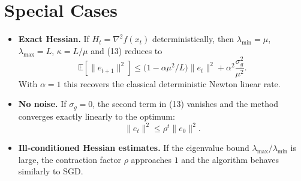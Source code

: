 \documentclass[11pt]{article}
\newcommand{\E}{\mathbb{E}}
\begin{document}
\section*{Special Cases}
\begin{itemize}
\item \textbf{Exact Hessian.} If $H_{t}=\nabla^{2}f(x_{t})$ deterministically,
then $\lambda_{\min}=\mu$, $\lambda_{\max}=L$, $\kappa=L/\mu$ and (13) reduces to
\[
\E[\|e_{t+1}\|^{2}]\le\bigl(1-\alpha\mu^{2}/L\bigr)\|e_{t}\|^{2}
+\alpha^{2}\frac{\sigma_{g}^{2}}{\mu^{2}} .
\]
With $\alpha=1$ this recovers the classical deterministic Newton linear rate.

\item \textbf{No noise.} If $\sigma_{g}=0$, the second term in (13) vanishes and
the method converges exactly linearly to the optimum:
\[
\|e_{t}\|^{2}\le\rho^{t}\|e_{0}\|^{2}.
\]

\item \textbf{Ill‑conditioned Hessian estimates.} If the eigenvalue bound
$\lambda_{\max}/\lambda_{\min}$ is large, the contraction factor $\rho$
approaches $1$ and the algorithm behaves similarly to SGD.
\end{itemize}
\end{document}
